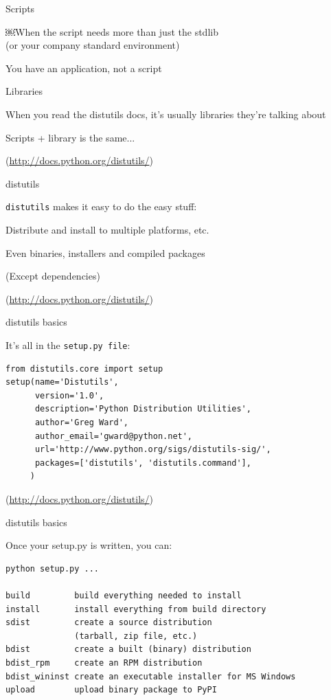 \documentclass{beamer}
\begin{document}
\begin{frame}[fragile]{Scripts}

\vfill
{\LARGE ￼When the script needs more than just the stdlib\\
 (or your company standard environment)}

\vfill
{\LARGE You have an application, not a script}

\vfill

\end{frame} 

\begin{frame}[fragile]{Libraries}

\vfill
{\LARGE When you read the distutils docs, it's usually libraries they're talking about}


\vfill
{\LARGE Scripts + library is the same...}


\vfill
(\url{http://docs.python.org/distutils/})
\end{frame} 

\begin{frame}[fragile]{distutils}

\vfill
{\LARGE \verb|distutils| makes it easy to do the easy stuff:}

\vfill
{\Large Distribute and install to multiple platforms, etc.}

\vfill
{\Large Even binaries, installers and compiled packages}

\vfill
{\Large (Except dependencies)}

\vfill
(\url{http://docs.python.org/distutils/})
\end{frame} 

\begin{frame}[fragile]{distutils basics}

\vfill
{\Large It's all in the \verb|setup.py file|:}

\begin{verbatim}
from distutils.core import setup
setup(name='Distutils',
      version='1.0',
      description='Python Distribution Utilities',
      author='Greg Ward',
      author_email='gward@python.net',
      url='http://www.python.org/sigs/distutils-sig/',
      packages=['distutils', 'distutils.command'],
     )
\end{verbatim}
\vfill
(\url{http://docs.python.org/distutils/})
\end{frame} 

\begin{frame}[fragile]{distutils basics}

{\Large Once your setup.py is written, you can:}

\begin{verbatim}
python setup.py ...

build         build everything needed to install
install       install everything from build directory
sdist         create a source distribution
              (tarball, zip file, etc.)
bdist         create a built (binary) distribution
bdist_rpm     create an RPM distribution
bdist_wininst create an executable installer for MS Windows
upload        upload binary package to PyPI
\end{verbatim}

\end{frame} 
\end{document}
